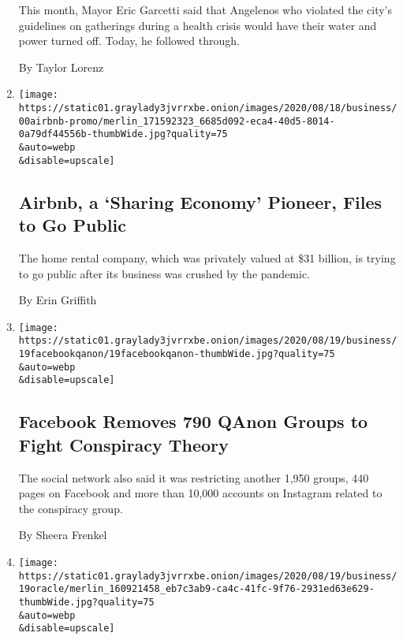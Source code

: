 \begin{enumerate}
  This month, Mayor Eric Garcetti said that Angelenos who violated the
  city's guidelines on gatherings during a health crisis would have
  their water and power turned off. Today, he followed through.

  By Taylor Lorenz
\item
  \href{/2020/08/19/technology/airbnb-ipo.html}{}

  \texttt{[image: https://static01.graylady3jvrrxbe.onion/images/2020/08/18/business/00airbnb-promo/merlin\_171592323\_6685d092-eca4-40d5-8014-0a79df44556b-thumbWide.jpg?quality=75\\\&auto=webp\\\&disable=upscale]}

  \hypertarget{airbnb-a-sharing-economy-pioneer-files-to-go-public}{%
  \subsection{Airbnb, a `Sharing Economy' Pioneer, Files to Go
  Public}\label{airbnb-a-sharing-economy-pioneer-files-to-go-public}}

  The home rental company, which was privately valued at \$31 billion,
  is trying to go public after its business was crushed by the pandemic.

  By Erin Griffith
\item
  \href{/2020/08/19/technology/facebook-qanon-groups-takedown.html}{}

  \texttt{[image: https://static01.graylady3jvrrxbe.onion/images/2020/08/19/business/19facebookqanon/19facebookqanon-thumbWide.jpg?quality=75\\\&auto=webp\\\&disable=upscale]}

  \hypertarget{facebook-removes-790-qanon-groups-to-fight-conspiracy-theory}{%
  \subsection{Facebook Removes 790 QAnon Groups to Fight Conspiracy
  Theory}\label{facebook-removes-790-qanon-groups-to-fight-conspiracy-theory}}

  The social network also said it was restricting another 1,950 groups,
  440 pages on Facebook and more than 10,000 accounts on Instagram
  related to the conspiracy group.

  By Sheera Frenkel
\item
  \href{/2020/08/19/technology/trump-oracle-tiktok.html}{}

  \texttt{[image: https://static01.graylady3jvrrxbe.onion/images/2020/08/19/business/19oracle/merlin\_160921458\_eb7c3ab9-ca4c-41fc-9f76-2931ed63e629-thumbWide.jpg?quality=75\\\&auto=webp\\\&disable=upscale]}


\end{enumerate}
